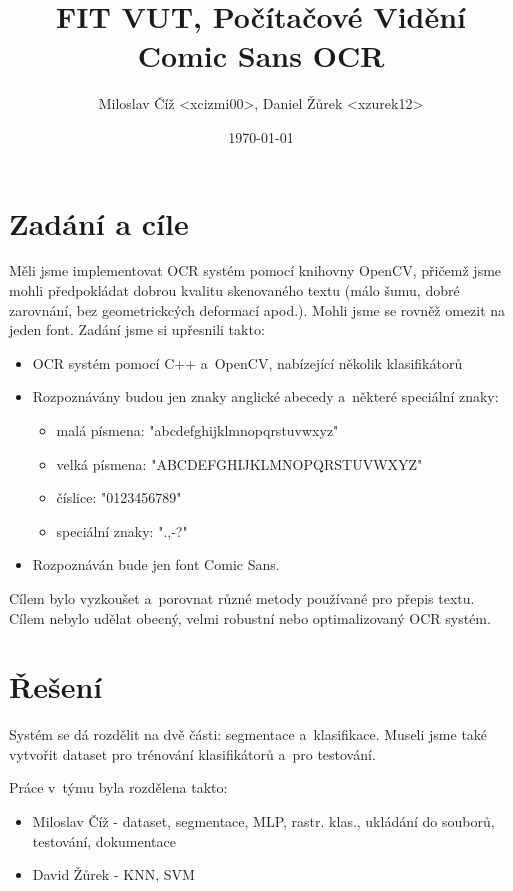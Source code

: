 \documentclass[12pt]{article}
\title{FIT VUT, Počítačové Vidění\\Comic Sans OCR}
\author{Miloslav Číž <xcizmi00>, Daniel Žůrek <xzurek12>}
\date{\today}
\begin{document}
\maketitle

\pagebreak[4]

\section{Zadání a cíle}

Měli jsme implementovat OCR systém pomocí knihovny OpenCV, přičemž jsme mohli
předpokládat dobrou kvalitu skenovaného textu (málo šumu, dobré zarovnání, bez geometrickcých
deformací apod.). Mohli jsme se rovněž omezit na jeden font. Zadání jsme si upřesnili takto:

\begin{itemize}
  \item OCR systém pomocí C++ a~OpenCV, nabízející několik klasifikátorů
  \item Rozpoznávány budou jen znaky anglické abecedy a~některé speciální znaky:
  \begin{itemize}
    \item malá písmena: "abcdefghijklmnopqrstuvwxyz"
    \item velká písmena: "ABCDEFGHIJKLMNOPQRSTUVWXYZ"
    \item číslice: "0123456789"
    \item speciální znaky: ".,-?"
  \end{itemize}
  \item Rozpoznáván bude jen font Comic Sans.
\end{itemize}

Cílem bylo vyzkoušet a~porovnat různé metody používané pro přepis textu. Cílem nebylo udělat
obecný, velmi robustní nebo optimalizovaný OCR systém.


\section{Řešení}

Systém se dá rozdělit na dvě části: segmentace a~klasifikace. Museli jsme také vytvořit
dataset pro trénování klasifikátorů a~pro testování.

Práce v~týmu byla rozdělena takto:

\begin{itemize}
  \item Miloslav Číž - dataset, segmentace, MLP, rastr. klas., ukládání do souborů, testování, dokumentace
  \item David Žůrek - KNN, SVM
\end{itemize}
\end{document}
